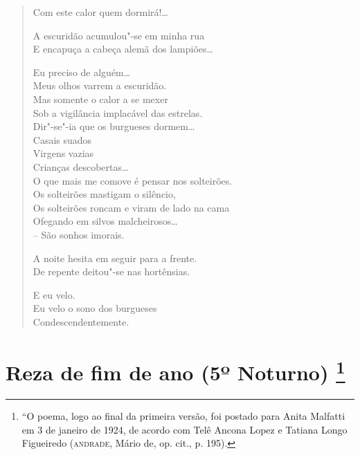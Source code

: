 {\begin{verse}
Com este calor quem dormirá!\ldots{}

A escuridão acumulou"-se em minha rua\\
E encapuça a cabeça alemã dos lampiões\ldots{}

Eu preciso de alguém\ldots{}\\
Meus olhos varrem a escuridão.\\
Mas somente o calor a se mexer\\
Sob a vigilância implacável das estrelas.\\
Dir"-se"-ia que os burgueses dormem\ldots{}\\
\qquad\qquad\qquad Casais suados\\
\qquad\qquad\qquad Virgens vazias\\
\qquad\qquad\qquad Crianças descobertas\ldots{}\\
O que mais me comove é pensar nos solteirões.\\
Os solteirões mastigam o silêncio,\\
Os solteirões roncam e viram de lado na cama\\
Ofegando em silvos malcheirosos\ldots{}\\
\quad\qquad\qquad\qquad\qquad -- São sonhos imorais.

A noite hesita em seguir para a frente.\\
De repente deitou"-se nas hortênsias.

E eu velo.\\
Eu velo o sono dos burgueses\\
Condescendentemente.
\end{verse}

\chapter[Reza de fim de ano (5º Noturno)\medskip]{Reza de fim de ano (5º Noturno) \footnote{``O poema, logo ao final da
  primeira versão, foi postado para Anita Malfatti em 3 de janeiro de
  1924, de acordo com Telê Ancona Lopez e
  Tatiana Longo Figueiredo (\textsc{andrade}, Mário de, op. cit., p. 195).}}

}
